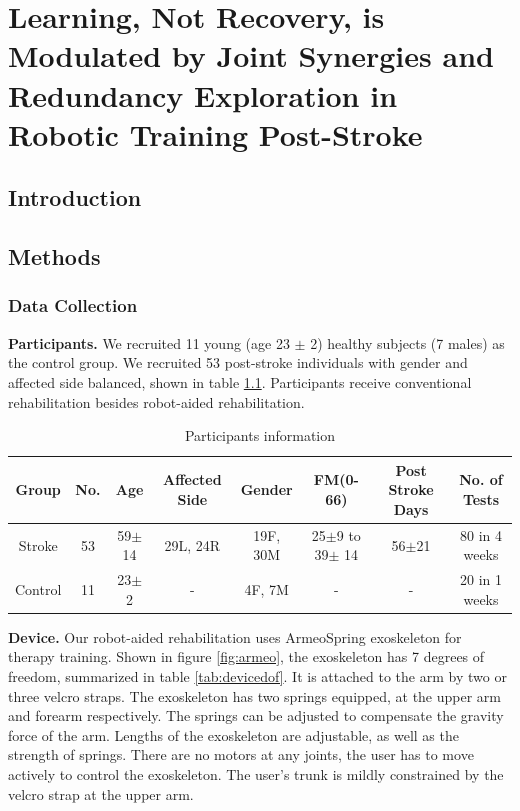 \chapter{Learning, Not Recovery, is Modulated by Joint Synergies and Redundancy Exploration in Robotic Training Post-Stroke}
\label{cha:armeospring}



\section{Introduction}



\section{Methods}

\subsection{Data Collection}

\textbf{Participants.} 
We recruited 11 young (age 23 $\pm$ 2) healthy subjects (7 males) as the control group.
We recruited 53 post-stroke individuals with gender and affected side balanced, shown in table \ref{tab:demog}. 
Participants receive conventional rehabilitation besides robot-aided rehabilitation.

\begin{table}[b]
	\begin{tabular}{c c c c c c c c}
		\hline
		Group & No. & Age & Affected Side & Gender & FM(0-66) & Post Stroke Days & No. of Tests\\
		\hline
		Stroke & 53 & 59$\pm$14 & 29L, 24R & 19F, 30M & 25$\pm$9 to 39$\pm$ 14 & 56$\pm$21 & 80 in 4 weeks \\ 
		Control & 11 & 23$\pm$2 & - & 4F, 7M & - & - & 20 in 1 weeks \\
		\hline
	\end{tabular}
	\caption{Participants information}
	\label{tab:demog}
\end{table}

\textbf{Device.}
Our robot-aided rehabilitation uses ArmeoSpring exoskeleton \cite{} for therapy training. 
Shown in figure \ref{fig:armeo}, the exoskeleton has 7 degrees of freedom, summarized in table \ref{tab:devicedof}. 
It is attached to the arm by two or three velcro straps. 
The exoskeleton has two springs equipped, at the upper arm and forearm respectively. 
The springs can be adjusted to compensate the gravity force of the arm. 
Lengths of the exoskeleton are adjustable, as well as the strength of springs. 
There are no motors at any joints, the user has to move actively to control the exoskeleton. 
The user's trunk is mildly constrained by the velcro strap at the upper arm.  

